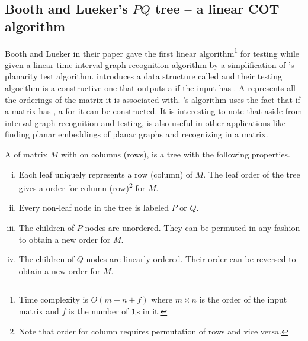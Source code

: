 \subsection{Booth and Lueker's $PQ$ tree -- a linear COT algorithm}

Booth and Lueker in their paper \cite{bl76} gave the first linear
algorithm\footnote{Time complexity is $O\left(m+n+f\right)$ where $m
  \times n$ is the order of the input matrix and $f$ is the number of
  $\textbf{1}$s in it.} for \cop testing while given a linear time interval
graph recognition algorithm by a simplification of 's planarity test algorithm.
%
\cite{bl76} introduces a data structure called \PQtree and their \COP
testing algorithm is a constructive one that outputs a \PQtree if the
input has \COP. A \PQtree represents all the \COP orderings of the
matrix it is associated with. \cite{bl76}'s algorithm uses the fact
that if a matrix has \COP, a \PQtree for it can be constructed. It is
interesting to note that aside from interval graph recognition and
\COP testing, \PQtree is also useful in other applications like
finding planar embeddings of planar graphs \cite{lec67,mcc04} and
recognizing \CROP in a matrix.

\begin{definition}
  A \PQtree of matrix $M$ with \COP on columns (rows), is a tree with
  the following properties.
  \begin{enumerate}[i.]
    \singlespacing
  \item Each leaf uniquely represents a row (column) of $M$. The leaf
    order of the tree gives a \COP order for column (row)\footnote{Note
      that \COP order for column requires permutation of rows and vice
      versa.} for $M$.
  \item Every non-leaf node in the tree is labeled $P$ or $Q$.
  \item \label{def::nodep} The children of $P$ nodes are
    unordered. They can be permuted in any fashion to obtain a new
    \COP order for $M$.
  \item \label{def::nodeq} The children of $Q$ nodes are linearly
    ordered. Their order can be reversed to obtain a new \COP
    order for $M$.
  \end{enumerate}
  \label{def:pqtree}
\end{definition}

